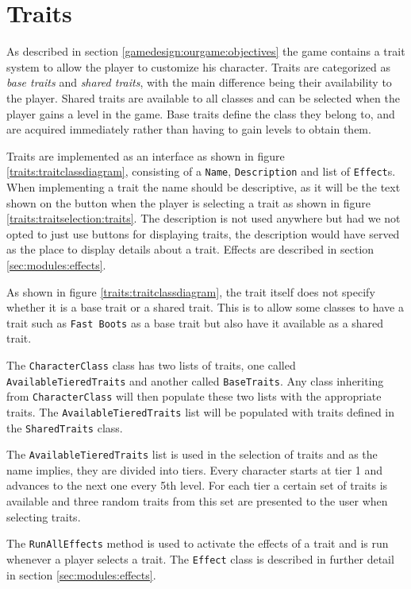 \section{Traits}
\label{sec:modules:traits}

As described in section \ref{gamedesign:ourgame:objectives} the game contains a trait system to allow the player to customize his character.
Traits are categorized as \textit{base traits} and \textit{shared traits}, with the main difference being their availability to the player.
Shared traits are available to all classes and can be selected when the player gains a level in the game.
Base traits define the class they belong to, and are acquired immediately rather than having to gain levels to obtain them.

Traits are implemented as an interface as shown in figure \ref{traits:traitclassdiagram}, consisting of a \texttt{Name}, \texttt{Description} and list of \texttt{Effect}s.
When implementing a trait the name should be descriptive, as it will be the text shown on the button when the player is selecting a trait as shown in figure \ref{traits:traitselection:traits}. 
The description is not used anywhere but had we not opted to just use buttons for displaying traits, the description would have served as the place to display details about a trait.
Effects are described in section \ref{sec:modules:effects}.

As shown in figure \ref{traits:traitclassdiagram}, the trait itself does not specify whether it is a base trait or a shared trait.
This is to allow some classes to have a trait such as \texttt{Fast Boots} as a base trait but also have it available as a shared trait.

The \texttt{CharacterClass} class has two lists of traits, one called \texttt{AvailableTieredTraits} and another called \texttt{BaseTraits}.
Any class inheriting from \texttt{CharacterClass} will then populate these two lists with the appropriate traits.
The \texttt{AvailableTieredTraits} list will be populated with traits defined in the \texttt{SharedTraits} class.

The \texttt{AvailableTieredTraits} list is used in the selection of traits and as the name implies, they are divided into tiers.
Every character starts at tier 1 and advances to the next one every 5th level.
For each tier a certain set of traits is available and three random traits from this set are presented to the user when selecting traits.

The \texttt{RunAllEffects} method is used to activate the effects of a trait and is run whenever a player selects a trait.
The \texttt{Effect} class is described in further detail in section \ref{sec:modules:effects}.



